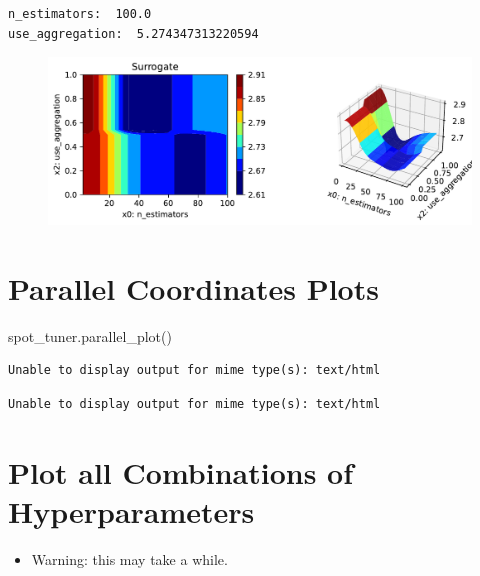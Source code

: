 \documentclass[
  letterpaper,
  DIV=11,
  numbers=noendperiod]{scrreprt}
\newenvironment{Shaded}{\begin{snugshade}}{\end{snugshade}}
\newcommand{\NormalTok}[1]{\textcolor[rgb]{0.00,0.23,0.31}{#1}}
\providecommand{\tightlist}{%
  \setlength{\itemsep}{0pt}\setlength{\parskip}{0pt}}\usepackage{longtable,booktabs,array}
\begin{document}
\begin{verbatim}
n_estimators:  100.0
use_aggregation:  5.274347313220594
\end{verbatim}

\begin{figure}[H]

{\centering \includegraphics{025_spot_hpt_river_friedman_amfr_files/figure-pdf/cell-37-output-2.pdf}

}

\end{figure}

\hypertarget{parallel-coordinates-plots-1}{%
\section{Parallel Coordinates
Plots}\label{parallel-coordinates-plots-1}}

\begin{Shaded}
\begin{Highlighting}[]
\NormalTok{spot\_tuner.parallel\_plot()}
\end{Highlighting}
\end{Shaded}

\begin{verbatim}
Unable to display output for mime type(s): text/html
\end{verbatim}

\begin{verbatim}
Unable to display output for mime type(s): text/html
\end{verbatim}

\hypertarget{plot-all-combinations-of-hyperparameters-6}{%
\section{Plot all Combinations of
Hyperparameters}\label{plot-all-combinations-of-hyperparameters-6}}

\begin{itemize}
\tightlist
\item
  Warning: this may take a while.
\end{itemize}
\end{document}
